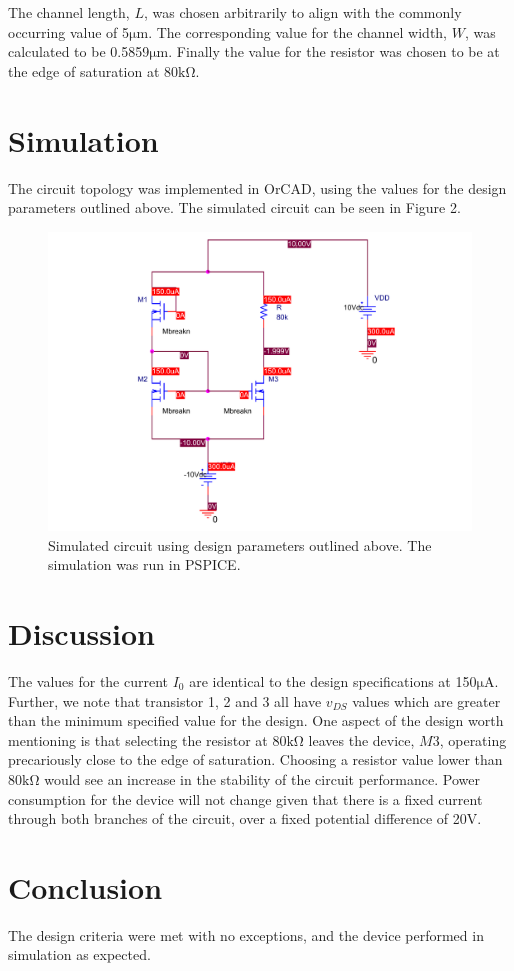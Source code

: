 \documentclass{article}
\begin{document}
The channel length, $L$, was chosen arbitrarily to align with the commonly occurring value of 5$\si{\micro\meter}$. The corresponding value for the channel width, $W$, was calculated to be 0.5859$\si{\micro\meter}$. Finally the value for the resistor was chosen to be at the edge of saturation at 80$\si{\kilo\ohm}$.


\section{Simulation}
The circuit topology was implemented in OrCAD, using the values for the design parameters outlined above. The simulated circuit can be seen in Figure 2.

\begin{figure}[H]
	\centering
	\includegraphics[scale=0.45]{output.pdf}
	\caption{Simulated circuit using design parameters outlined above. The simulation was run in PSPICE.}
\end{figure}



\section{Discussion}
The values for the current $I_0$ are identical to the design specifications at 150$\si{\micro\ampere}$. Further, we note that transistor 1, 2 and 3 all have $v_{DS}$ values which are greater than the minimum specified value for the design. One aspect of the design worth mentioning is that selecting the resistor at 80$\si{\kilo\ohm}$ leaves the device, $M3$, operating precariously close to the edge of saturation. Choosing a resistor value lower than 80$\si{\kilo\ohm}$ would see an increase in the stability of the circuit performance. Power consumption for the device will not change given that there is a fixed current through both branches of the circuit, over a fixed potential difference of 20$\si{\volt}$.

\section{Conclusion}
The design criteria were met with no exceptions, and the device performed in simulation as expected.
\end{document}
